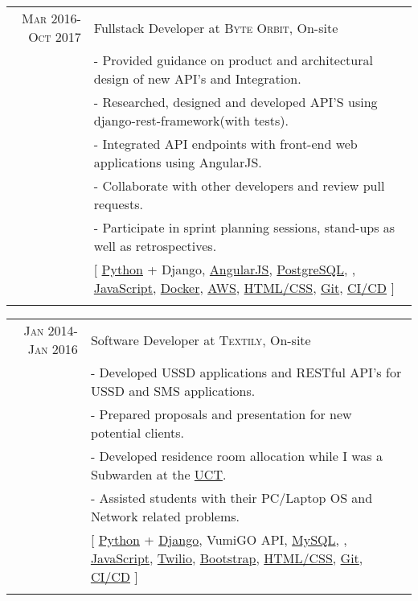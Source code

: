 \documentclass[a4paper,10pt]{article} %
\begin{document}
\begin{tabular}{r|p{15cm}}
\textsc{Mar 2016-Oct 2017} & Fullstack Developer at \textsc{Byte Orbit}, On-site \emph{}\\
& \footnotesize{- Provided guidance on product and architectural design of new API’s and Integration.}\\
& \footnotesize{- Researched, designed and developed API’S using django-rest-framework(with tests).}\\
& \footnotesize{- Integrated API endpoints with front-end web applications using AngularJS.}\\
& \footnotesize{- Collaborate with other developers and review pull requests.}\\
& \footnotesize{- Participate in sprint planning sessions, stand-ups as well as retrospectives.}\\
& \footnotesize{[ \href{https://www.python.org/}{Python} + Django, \href{https://angular.dev/}{AngularJS}, \href{https://www.postgresql.org/}{PostgreSQL}, \href{}{}, \href{https://developer.mozilla.org/en-US/docs/Web/JavaScript}{JavaScript}, \href{https://www.docker.com/}{Docker}, \href{https://aws.amazon.com/s3/}{AWS}, \href{https://datatracker.ietf.org/doc/html/rfc7993}{HTML/CSS}, \href{https://git-scm.com/}{Git}, \href{https://en.wikipedia.org/wiki/CI/CD}{CI/CD} ]}\\
\multicolumn{2}{c}{} \\
\end{tabular}

\begin{tabular}{rl}	
\textsc{Jan 2014-Jan 2016} & Software Developer at \textsc{Textily}, On-site \emph{}\\
& \footnotesize{- Developed USSD applications and RESTful API’s for USSD and SMS applications.}\\
& \footnotesize{- Prepared proposals and presentation for new potential clients.}\\
& \footnotesize{- Developed residence room allocation while I was a Subwarden at the \href{https://www.uct.ac.za/}{UCT}.}\\
& \footnotesize{- Assisted students with their PC/Laptop OS and Network related problems.}\\
& \footnotesize{[ \href{https://www.python.org/}{Python} + \href{https://www.djangoproject.com/}{Django}, {VumiGO API}, \href{https://www.mysql.com/}{MySQL}, \href{}{}, \href{https://developer.mozilla.org/en-US/docs/Web/JavaScript}{JavaScript}, \href{https://www.twilio.com/en-us}{Twilio}, \href{https://getbootstrap.com/}{Bootstrap}, \href{https://datatracker.ietf.org/doc/html/rfc7993}{HTML/CSS}, \href{https://git-scm.com/}{Git}, \href{https://en.wikipedia.org/wiki/CI/CD}{CI/CD} ]}\\
\multicolumn{2}{c}{} \\
\end{tabular}
\end{document}

